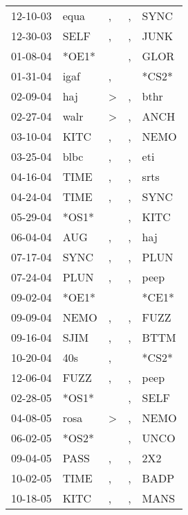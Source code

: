 \begin{supertabular}{lllll}
 12-10-03 &   equa &                , &             , &   SYNC \\
 12-30-03 &   SELF &                , &             , &   JUNK \\
 01-08-04 &  *OE1* &                  &             , &   GLOR \\
 01-31-04 &   igaf &                , &               &  *CS2* \\
 02-09-04 &    haj &     \textgreater &             , &   bthr \\
 02-27-04 &   walr &     \textgreater &             , &   ANCH \\
 03-10-04 &   KITC &                , &             , &   NEMO \\
 03-25-04 &   blbc &                , &             , &    eti \\
 04-16-04 &   TIME &                , &             , &   srts \\
 04-24-04 &   TIME &                , &             , &   SYNC \\
 05-29-04 &  *OS1* &                  &             , &   KITC \\
 06-04-04 &    AUG &                , &             , &    haj \\
 07-17-04 &   SYNC &                , &             , &   PLUN \\
 07-24-04 &   PLUN &                , &             , &   peep \\
 09-02-04 &  *OE1* &                  &               &  *CE1* \\
 09-09-04 &   NEMO &                , &             , &   FUZZ \\
 09-16-04 &   SJIM &                , &             , &   BTTM \\
 10-20-04 &    40s &                , &               &  *CS2* \\
 12-06-04 &   FUZZ &                , &             , &   peep \\
 02-28-05 &  *OS1* &                  &             , &   SELF \\
 04-08-05 &   rosa &     \textgreater &             , &   NEMO \\
 06-02-05 &  *OS2* &                  &             , &   UNCO \\
 09-04-05 &   PASS &                , &             , &    2X2 \\
 10-02-05 &   TIME &                , &             , &   BADP \\
 10-18-05 &   KITC &                , &             , &   MANS \\

\end{supertabular}
